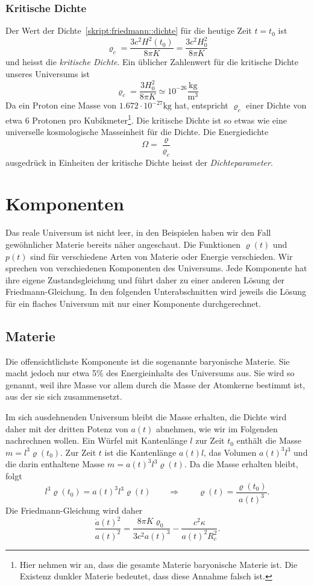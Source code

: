 \subsubsection{Kritische Dichte}
Der Wert der Dichte~\eqref{skript:friedmann::dichte}
für die heutige Zeit $t=t_0$ ist
\[
\varrho_c = \frac{3c^2H^2(t_0)}{8\pi K}=\frac{3c^2H_0^2}{8\pi K}
\]
und heisst die {\em kritische Dichte}.
%
%
Ein üblicher Zahlenwert für die kritische Dichte unseres Universums ist
\[
\varrho_c = \frac{3H_0^2}{8\pi K}\simeq 10^{-26}\frac{\text{kg}}{\text{m}^3}
\]
Da ein Proton eine Masse von $1.672\cdot 10^{-27}\text{kg}$ hat, entspricht
$\varrho_c$ einer Dichte von etwa $6$ Protonen pro Kubikmeter\footnote{%
Hier nehmen wir an, dass die gesamte Materie baryonische Materie ist.
Die Existenz dunkler Materie bedeutet, dass diese Annahme falsch ist.
}.
Die kritische Dichte ist so etwas wie eine universelle kosmologische
Masseinheit für die Dichte.
Die Energiedichte
\[
\Omega=\frac{\varrho}{\varrho_c}
\]
ausgedrück in Einheiten der kritische Dichte heisst
der {\em Dichteparameter}.

\section{Komponenten}
Das reale Universum ist nicht leer, in den Beispielen haben wir den
Fall gewöhnlicher Materie bereits näher angeschaut.
Die Funktionen $\varrho(t)$ und $p(t)$ sind für verschiedene
Arten von Materie oder Energie verschieden.
Wir sprechen von verschiedenen Komponenten des Universums.
Jede Komponente hat ihre eigene Zustandsgleichung und führt
daher zu einer anderen Lösung der Friedmann-Gleichung.
In den folgenden Unterabschnitten wird jeweils die Lösung für
ein flaches Universum mit nur einer Komponente durchgerechnet.

\subsection{Materie}
Die offensichtlichste Komponente ist die sogenannte baryonische Materie.
Sie macht jedoch nur etwa 5\% des Energieinhalts des Universums aus.
Sie wird so genannt, weil ihre Masse vor allem durch die Masse der Atomkerne
bestimmt ist, aus der sie sich zusammensetzt.

Im sich ausdehnenden Universum bleibt die Masse erhalten, die Dichte wird
daher mit der dritten Potenz von $a(t)$ abnehmen, wie wir im Folgenden
nachrechnen wollen.
Ein Würfel mit Kantenlänge $l$ zur Zeit $t_0$ enthält die Masse
$m=l^3 \varrho(t_0)$.
Zur Zeit $t$ ist die Kantenlänge $a(t)l$, das Volumen $a(t)^3l^3$
und die darin enthaltene Masse $m=a(t)^3l^3\varrho(t)$.
Da die Masse erhalten bleibt, folgt
\[
l^3 \varrho(t_0)
=
a(t)^3l^3\varrho(t)
\qquad\Rightarrow\qquad
\varrho(t)=\frac{\varrho(t_0)}{a(t)^3}.
\]
Die Friedmann-Gleichung wird daher
\begin{equation}
\frac{\dot a(t)^2}{a(t)^2}
=
\frac{8\pi K\varrho_0}{3c^2a(t)^3}-\frac{c^2\kappa}{a(t)^2R_c^2}.
\end{equation}

